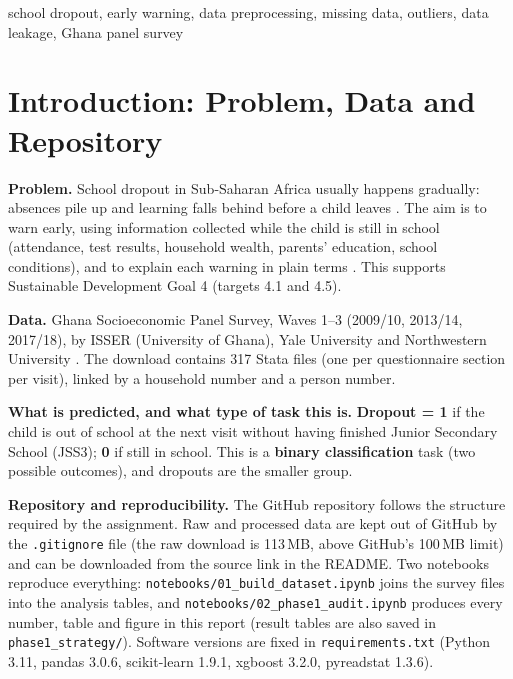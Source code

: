 \documentclass[conference,a4paper]{IEEEtran}
\newcommand{\var}[1]{\texttt{#1}}
\begin{document}
\begin{IEEEkeywords}
school dropout, early warning, data preprocessing, missing data, outliers, data leakage, Ghana panel survey
\end{IEEEkeywords}

\section{Introduction: Problem, Data and Repository}
\textbf{Problem.} School dropout in Sub-Saharan Africa usually happens gradually: absences pile up and learning falls behind before a child leaves \cite{balfanz2007}. The aim is to warn early, using information collected while the child is still in school (attendance, test results, household wealth, parents' education, school conditions), and to explain each warning in plain terms \cite{shap}. This supports Sustainable Development Goal 4 (targets 4.1 and 4.5).

\textbf{Data.} Ghana Socioeconomic Panel Survey, Waves 1--3 (2009/10, 2013/14, 2017/18), by ISSER (University of Ghana), Yale University and Northwestern University \cite{gsps}. The download contains 317 Stata files (one per questionnaire section per visit), linked by a household number and a person number.

\textbf{What is predicted, and what type of task this is.} \textbf{Dropout = 1} if the child is out of school at the next visit without having finished Junior Secondary School (JSS3); \textbf{0} if still in school. This is a \textbf{binary classification} task (two possible outcomes), and dropouts are the smaller group.

\textbf{Repository and reproducibility.} The GitHub repository follows the structure required by the assignment. Raw and processed data are kept out of GitHub by the \var{.gitignore} file (the raw download is 113\,MB, above GitHub's 100\,MB limit) and can be downloaded from the source link in the README. Two notebooks reproduce everything: \var{notebooks/01\_build\_dataset.ipynb} joins the survey files into the analysis tables, and \var{notebooks/02\_phase1\_audit.ipynb} produces every number, table and figure in this report (result tables are also saved in \var{phase1\_strategy/}). Software versions are fixed in \var{requirements.txt} (Python 3.11, pandas 3.0.6, scikit-learn 1.9.1, xgboost 3.2.0, pyreadstat 1.3.6).
\end{document}
